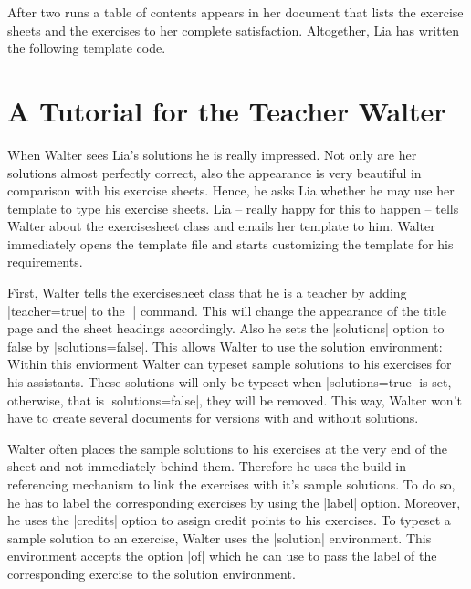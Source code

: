 \documentclass[a4paper,fleqn]{report}
\def\exercisesheet{{exercisesheet}}
\begin{document}


\noindent After two runs a table of contents appears in her document
that lists the exercise sheets and the exercises to her complete
satisfaction. Altogether, Lia has written the following template code.




\section{A Tutorial for the Teacher Walter}

When Walter sees Lia's solutions he is really impressed. Not only are
her solutions almost perfectly correct, also the appearance is very
beautiful in comparison with his exercise sheets. Hence, he asks Lia
whether he may use her template to type his exercise sheets. Lia --
really happy for this to happen -- tells Walter about the
\exercisesheet{} class and emails her template to him. Walter
immediately opens the template file and starts customizing the
template for his requirements.

First, Walter tells the \exercisesheet{} class that he is a teacher by
adding |teacher=true| to the |\sheetconf| command. This will change
the appearance of the title page and the sheet headings accordingly.
Also he sets the |solutions| option to false by |solutions=false|.
This allows Walter to use the solution environment: Within this
enviorment Walter can typeset sample solutions to his exercises for
his assistants. These solutions will only be typeset when
|solutions=true| is set, otherwise, that is |solutions=false|, they
will be removed. This way, Walter won't have to create several
documents for versions with and without solutions.



\noindent Walter often places the sample solutions to his exercises at
the very end of the sheet and not immediately behind them. Therefore
he uses the build-in referencing mechanism to link the exercises with
it's sample solutions. To do so, he has to label the corresponding
exercises by using the |label| option. Moreover, he uses the |credits|
option to assign credit points to his exercises. To typeset a sample
solution to an exercise, Walter uses the |solution| environment. This
environment accepts the option |of| which he can use to pass the label
of the corresponding exercise to the solution environment.
\end{document}
